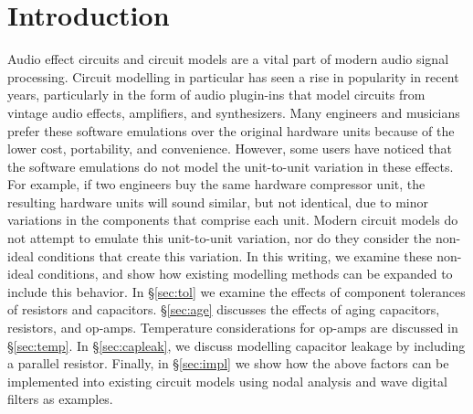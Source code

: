 \documentclass[twoside,a4paper]{article}
\title{\papertitle}
\affiliation{
\paperauthorA \, }
{\href{http://ccrma.stanford.edu}{Center for Computer Research in Music and Acoustics} \\ Stanford University \\ Palo Alto, CA \\ {\tt \href{mailto:jatin@ccrma.stanford.edu}{jatin@ccrma.stanford.edu}}}
\newif\ifpdf
\begin{document}
\ifpdf %
  \DeclareGraphicsExtensions{.png,.jpg,.pdf}
\else  %
\fi

\maketitle
%
\begin{abstract}
Traditional circuit modelling methods typically assume ideal
circuit components. Real world audio circuits exhibit
variations in behavior due to non-ideal factors including
component tolerances, operating temperature, and aging.
We present a brief discussion of each of these non-ideal
factors for resistors, capacitors, and operational amplifiers
(op-amps), and show how they each individually affect the
behavior of a circuit model. We present a models of Sallen-Key
lowpass filter, and diode clipper circuits that incorporates all
of the non-ideal factors together.
\end{abstract}

\section{Introduction} \label{sec:intro}
%
Audio effect circuits and circuit models are a vital part
of modern audio signal processing. Circuit modelling in
particular has seen a rise in popularity in recent years,
particularly in the form of audio plugin-ins that model
circuits from vintage audio effects, amplifiers, and synthesizers.
Many engineers and musicians prefer these software emulations over
the original hardware units because of the lower cost, portability,
and convenience. However, some users have noticed that the software
emulations do not model the unit-to-unit variation in these effects.
For example, if two engineers buy the same hardware compressor unit,
the resulting hardware units will sound similar, but not identical,
due to minor variations in the components that comprise each unit.
Modern circuit models do not attempt to emulate this unit-to-unit
variation, nor do they consider the non-ideal conditions that create
this variation.
\newline\newline
In this writing, we examine these non-ideal conditions, and show how
existing modelling methods can be expanded to include this behavior.
In \S\ref{sec:tol} we examine the effects of component tolerances of resistors
and capacitors. \S\ref{sec:age} discusses the effects of aging capacitors,
resistors, and op-amps. Temperature considerations for
op-amps are discussed in \S\ref{sec:temp}. In \S\ref{sec:capleak}, we
discuss modelling capacitor leakage by including a parallel resistor.
Finally, in \S\ref{sec:impl} we show how the above factors can be
implemented into existing circuit models using nodal analysis and wave
digital filters as examples.
\end{document}
